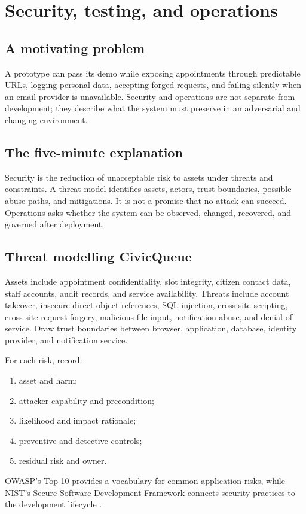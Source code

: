 \chapter{Security, testing, and operations}
\label{ch:operations}

\section{A motivating problem}
A prototype can pass its demo while exposing appointments through predictable URLs, logging personal data, accepting forged requests, and failing silently when an email provider is unavailable. Security and operations are not separate from development; they describe what the system must preserve in an adversarial and changing environment.


\section{The five-minute explanation}
Security is the reduction of unacceptable risk to assets under threats and constraints. A threat model identifies assets, actors, trust boundaries, possible abuse paths, and mitigations. It is not a promise that no attack can succeed. Operations asks whether the system can be observed, changed, recovered, and governed after deployment.

\section{Threat modelling CivicQueue}
Assets include appointment confidentiality, slot integrity, citizen contact data, staff accounts, audit records, and service availability. Threats include account takeover, insecure direct object references, SQL injection, cross-site scripting, cross-site request forgery, malicious file input, notification abuse, and denial of service. Draw trust boundaries between browser, application, database, identity provider, and notification service.

For each risk, record:
\begin{enumerate}
\item asset and harm;
\item attacker capability and precondition;
\item likelihood and impact rationale;
\item preventive and detective controls;
\item residual risk and owner.
\end{enumerate}
OWASP's Top 10 provides a vocabulary for common application risks, while NIST's Secure Software Development Framework connects security practices to the development lifecycle \citep{owasptop10,nistssdf}.


